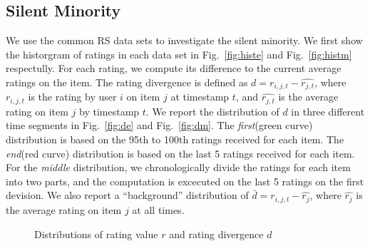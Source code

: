 \documentclass[sigconf]{acmart}
\begin{document}
\subsection{Silent Minority}
 We use the common RS data sets to investigate the silent minority. We first show the historgram of ratings in each data set in Fig.~\ref{fig:histe} and Fig.~\ref{fig:histm} respectully. For each rating, we compute its difference to the current average ratings on the item. The rating divergence is defined as $d=r_{i,j,t}-\hat{r_{j,t}}$, where $r_{i,j,t}$ is the rating by user $i$ on item $j$ at timestamp $t$, and $\hat{r_{j,t}}$ is the average rating on item $j$ by timestamp $t$. We report the distribution of $d$ in three different time segments in Fig.~\ref{fig:de} and Fig.~\ref{fig:dm}. The \textit{first}(green curve) distribution is based on the 95th to 100th ratings received for each item. The \textit{end}(red curve) distribution is based on the last 5 ratings received for each item. For the \textit{middle} distribution, we chronologically divide the ratings for each item into two parts, and the computation is excecuted on the last 5 ratings on the first devision.  We also report a ``background'' distribution of $\bar{d}=r_{i,j,t}-\hat{r_{j}}$, where $\hat{r_{j}}$ is the average rating on item $j$ at all times.
\begin{figure}[htbp]
\centering
{}
\caption{Distributions of rating value $r$ and rating divergence $d$}\label{fig:minority}
\end{figure}
\end{document}
